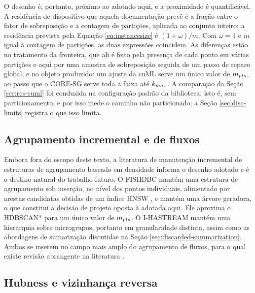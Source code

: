 O desenho é, portanto, próximo ao adotado aqui, e a proximidade é quantificável. A residência de dispositivo que aquela documentação prevê é a fração entre o fator de sobreposição e a contagem de partições, aplicada ao conjunto inteiro; a residência prevista pela Equação \eqref{eq:instancesize} é $(1+\omega)/m$. Com $\omega = 1$ e $m$ igual à contagem de partições, as duas expressões coincidem. As diferenças estão no tratamento da fronteira, que ali é feito pela presença de cada ponto em várias partições e aqui por uma amostra de sobreposição seguida de um passo de reparo global, e no objeto produzido: um ajuste da cuML serve um único valor de $m_{pts}$, ao passo que o \ac{CORE-SG} serve toda a faixa até $k_{max}$. A comparação da Seção \ref{sec:res-cuml} foi conduzida na configuração padrão da biblioteca, isto é, sem particionamento, e por isso mede o caminho não particionado; a Seção \ref{sec:disc-limits} registra o que isso limita.\\

\subsection{Agrupamento incremental e de fluxos\label{sec:rel-streams}}

Embora fora do escopo deste texto, a literatura de manutenção incremental de estruturas de agrupamento baseado em densidade informa o desenho adotado e é o destino natural do trabalho futuro. O FISHDBC \cite{fishdbc} mantém uma estrutura de agrupamento sob inserção, no nível dos pontos individuais, alimentado por arestas candidatas obtidas de um índice \ac{HNSW} \cite{hnsw}, e mantém uma árvore geradora, o que constitui a decisão de projeto oposta à adotada aqui. Ele aproxima o \ac{HDBSCAN*} para um único valor de $m_{pts}$. O I-HASTREAM \cite{ihastream} mantém uma hierarquia sobre microgrupos, portanto em granularidade distinta, assim como as abordagens de sumarização discutidas na Seção \ref{sec:discarded-summarization}. Ambos se inserem no campo mais amplo do agrupamento de fluxos, para o qual existe revisão abrangente na literatura \cite{data-stream}.\\

\subsection{Hubness e vizinhança reversa\label{sec:rel-hubness}}

